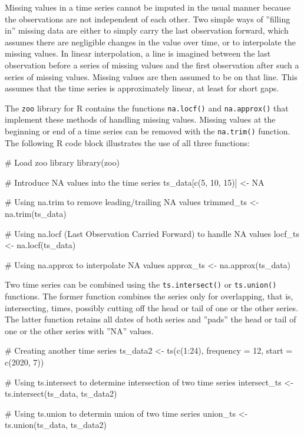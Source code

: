 Missing values in a time series cannot be imputed in the usual manner because the observations are not independent of each other. Two simple ways of ''filling in'' missing data are either to simply carry the last observation forward, which assumes there are negligible changes in the value over time, or to interpolate the missing values. In linear interpolation, a line is imagined between the last observation before a series of missing values and the first observation after such a series of missing values. Missing values are then assumed to be on that line. This assumes that the time series is approximately linear, at least for short gaps. 

The \texttt{zoo} library for R contains the functions \texttt{na.locf()} and \texttt{na.approx()} that implement these methods of handling missing values. Missing values at the beginning or end of a time series can be removed with the \texttt{na.trim()} function. The following R code block illustrates the use of all three functions:

\begin{Rcode}
# Load zoo library
library(zoo)

# Introduce NA values into the time series
ts_data[c(5, 10, 15)] <- NA

# Using na.trim to remove leading/trailing NA values
trimmed_ts <- na.trim(ts_data)

# Using na.locf (Last Observation Carried Forward) to handle NA values
locf_ts <- na.locf(ts_data)

# Using na.approx to interpolate NA values
approx_ts <- na.approx(ts_data)
\end{Rcode}

Two time series can be combined using the \texttt{ts.intersect()} or \texttt{ts.union()} functions. The former function combines the series only for overlapping, that is, intersecting, times, possibly cutting off the head or tail of one or the other series. The latter function retains all dates of both series and ''pads'' the head or tail of one or the other series with ''NA'' values. 

\begin{Rcode}
# Creating another time series
ts_data2 <- ts(c(1:24), frequency = 12, start = c(2020, 7))

# Using ts.intersect to determine intersection of two time series
intersect_ts <- ts.intersect(ts_data, ts_data2)

# Using ts.union to determin union of two time series
union_ts <- ts.union(ts_data, ts_data2)
\end{Rcode}

